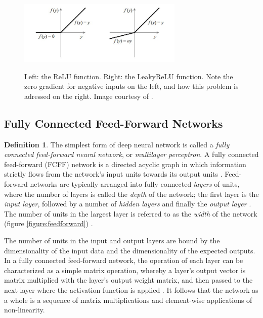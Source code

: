 \documentclass[12pt, titlepage]{report}
\theoremstyle{definition}
\newtheorem{definition}{Definition}
\begin{document}
\begin{figure}
\centering
\includegraphics[width=0.7\textwidth]{img/relu.jpg}\\
\caption{Left: the ReLU function. Right: the LeakyReLU function. Note the zero gradient for negative inputs on the left, and how this problem is adressed on the right. Image courtesy of \cite{sharma2017activation}.}
\label{figure:relu}
\end{figure}



\subsection{Fully Connected Feed-Forward Networks}
\begin{definition}
The simplest form of deep neural network is called a \emph{fully connected feed-forward neural network}, or \emph{multilayer perceptron}. A fully connected feed-forward (FCFF) network is a directed acyclic graph in which information strictly flows from the network's input units towards its output units \cite[p. 164]{goodfellow2016deep}. Feed-forward networks are typically arranged into fully connected \emph{layers} of units, where the number of layers is called the \emph{depth} of the network; the first layer is the \emph{input layer}, followed by a number of \emph{hidden layers} and finally the \emph{output layer} \cite[p. 164-165]{goodfellow2016deep}. The number of units in the largest layer is referred to as the \emph{width} of the network (figure \ref{figure:feedforward}) \cite[p. 164-165]{goodfellow2016deep}.
\end{definition}

The number of units in the input and output layers are bound by the dimensionality of the input data and the dimensionality of the expected outputs. In a fully connected feed-forward network, the operation of each layer can be characterized as a simple matrix operation, whereby a layer's output vector is matrix multiplied with the layer's output weight matrix, and then passed to the next layer where the activation function is applied \cite[p. 170-171]{goodfellow2016deep}. It follows that the network as a whole is a sequence of matrix multiplications and element-wise applications of non-linearity.
\end{document}
